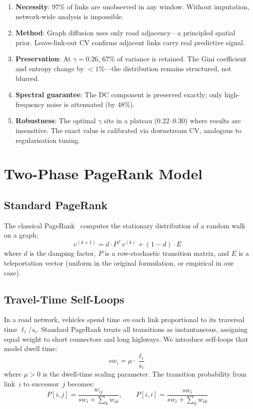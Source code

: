 \documentclass[11pt]{article}
\begin{document}
\begin{enumerate}
    \item \textbf{Necessity}: 97\% of links are unobserved in any window.  Without imputation, network-wide analysis is impossible.
    \item \textbf{Method}: Graph diffusion uses only road adjacency---a principled spatial prior.  Leave-link-out CV confirms adjacent links carry real predictive signal.
    \item \textbf{Preservation}: At $\gamma = 0.26$, 67\% of variance is retained.  The Gini coefficient and entropy change by $<1\%$---the distribution remains structured, not blurred.
    \item \textbf{Spectral guarantee}: The DC component is preserved exactly; only high-frequency noise is attenuated (by 48\%).
    \item \textbf{Robustness}: The optimal $\gamma$ sits in a plateau (0.22--0.30) where results are insensitive.  The exact value is calibrated via downstream CV, analogous to regularisation tuning.
\end{enumerate}


\section{Two-Phase PageRank Model}
\label{sec:model}

\subsection{Standard PageRank}
The classical PageRank~\cite{page1999pagerank, brin1998anatomy} computes the stationary distribution of a random walk on a graph:
\begin{equation}
    v^{(k+1)} = d \cdot P^\top v^{(k)} + (1-d) \cdot E
\end{equation}
where $d$ is the damping factor, $P$ is a row-stochastic transition matrix, and $E$ is a teleportation vector (uniform in the original formulation, or empirical in our case).

\subsection{Travel-Time Self-Loops}
\label{sec:selfloops}

In a road network, vehicles spend time \emph{on} each link proportional to its traversal time $\ell_i / s_i$.
Standard PageRank treats all transitions as instantaneous, assigning equal weight to short connectors and long highways.
We introduce self-loops that model dwell time:
\begin{equation}
    \boxed{sw_i = \mu \cdot \frac{\ell_i}{s_i}}
    \label{eq:selfloop}
\end{equation}
where $\mu > 0$ is the dwell-time scaling parameter.
The transition probability from link~$i$ to successor~$j$ becomes:
\begin{equation}
    P[i, j] = \frac{w_{ij}}{sw_i + \sum_k w_{ik}}, \qquad
    P[i, i] = \frac{sw_i}{sw_i + \sum_k w_{ik}}
    \label{eq:transition}
\end{equation}
\end{document}

